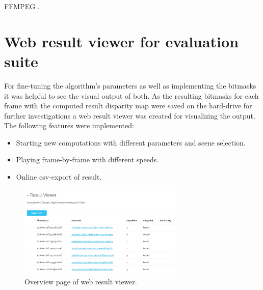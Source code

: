 FFMPEG \citep{FFMPEG2010}.

\section{Web result viewer for evaluation suite}

For fine-tuning the algorithm's parameters as well as implementing the bitmasks it was helpful to see the visual output of both.
As the resulting bitmasks for each frame with the computed result disparity map were saved on the hard-drive for further investigations a web result viewer was created for visualizing the output.
The following features were implemented:
\begin{itemize}
  \item Starting new computations with different parameters and scene selection.
  \item Playing frame-by-frame with different speeds.
  \item Online csv-export of result.
\end{itemize}

\begin{figure}[p!]
  \centering
  \includegraphics[angle=90,width=0.7\textwidth]{src/images/result-viewer-overview.png}
  \caption{Overview page of web result viewer.}
  \label{fig:web-overview}
\end{figure}

